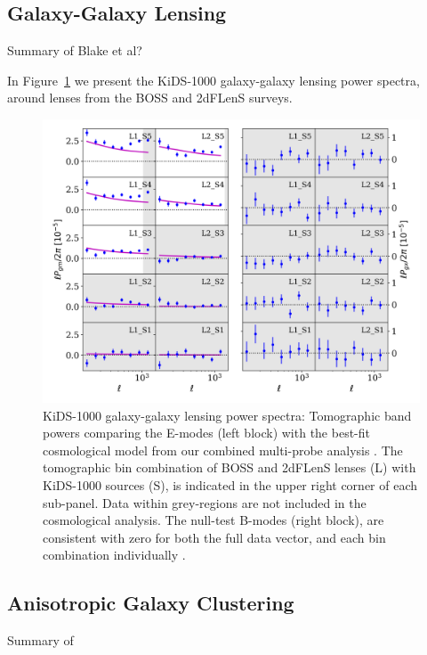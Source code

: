\subsection{Galaxy-Galaxy Lensing}
\label{sec:GGL}
Summary of Blake et al?


In Figure~\ref{fig:Pgk} we present the KiDS-1000 galaxy-galaxy lensing
power spectra, around lenses from the BOSS and 2dFLenS surveys.

\begin{figure}
        \includegraphics[width=\textwidth]{Data_Plots/Pgk/Pgk_K1000_2Dbins_v2_goldclasses_Flag_SOM_Fid.png}
        \caption{KiDS-1000 galaxy-galaxy lensing power spectra:
          Tomographic band powers comparing the E-modes (left block)
          with the best-fit
          cosmological model from our combined multi-probe analysis
          .  The tomographic 
        bin combination of BOSS and 2dFLenS lenses (L) with KiDS-1000
        sources (S), is indicated in the upper right corner of each
        sub-panel.  Data within grey-regions are not included in the cosmological analysis.
        The null-test B-modes (right block), are
      consistent with zero for both the full data vector, and each
     bin combination individually .}
        \label{fig:Pgk}
\end{figure}

\subsection{Anisotropic Galaxy Clustering}
\label{sec:clustering}
Summary of \citet{sanchez/etal:2017}

